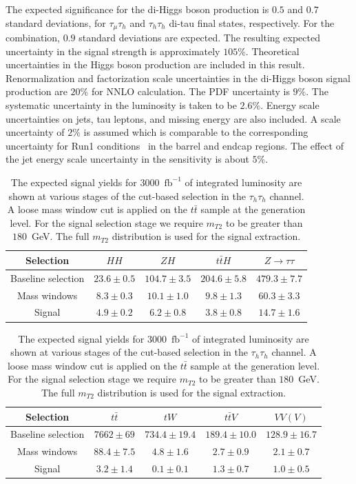 The expected significance for the di-Higgs boson production is $0.5$ and $0.7$ standard deviations, for
$\tau_{\mu}\tau_{h}$ and $\tau_{h}\tau_{h}$ di-tau final states,
respectively. For the combination, $0.9$ standard deviations are expected. The resulting expected
uncertainty in the signal strength is approximately
$105\%$. Theoretical uncertainties in the Higgs boson production are
included in this result. Renormalization and factorization scale
uncertainties in the di-Higgs boson signal production are $20\%$ for NNLO
calculation. The PDF uncertainty is $9\%$. The systematic uncertainty in
the luminosity is taken to be $2.6\%$. Energy scale uncertainties on jets, tau
leptons, and missing energy are also included. A scale uncertainty of $2\%$ is assumed which is comparable to the corresponding uncertainty for Run1 conditions~\cite{CMS-DP-2013-011} in the barrel and endcap regions. The effect of the jet energy scale uncertainty in the sensitivity is about $5\%$.       

\begin{table}[!ht]
\begin{center} 
\begin{tabular}{|c|c|c|c|c|}
\hline
Selection  & $HH$ & $ZH$ & $t\bar{t}H$ & $Z\rightarrow \tau\tau$  \\  \hline
Baseline selection & $23.6\pm0.5$ & $104.7\pm3.5$ & $204.6\pm5.8$ & $479.3\pm7.7$  \\
Mass windows  & $8.3\pm0.3$ & $10.1\pm1.0$ & $9.8\pm1.3$ & $60.3\pm3.3$ \\ 
Signal  & $4.9\pm0.2$ & $6.2\pm0.8$ &  $3.8\pm0.8$ & $14.7\pm1.6$ \\ \hline
\end{tabular}

\vspace{2mm}

\begin{tabular}{|c|c|c|c|c|}
\hline
Selection   & $t\bar{t}$ & $tW$ & $t\bar{t}V$ & $VV(V)$  \\  \hline
Baseline selection & $7662\pm69$ & $734.4\pm19.4$ & $189.4\pm10.0$ & $128.9\pm16.7$  \\
Mass windows  & $88.4\pm7.5$ & $4.8\pm1.6$ & $2.7\pm0.9$ & $2.1\pm0.7$ \\ 
Signal  & $3.2\pm1.4$ & $0.1\pm0.1$ & $1.3\pm0.7$ & $1.0\pm0.5$ \\ \hline
\end{tabular}

\caption{ The expected signal yields for $3000$~$\mathrm{fb}^{-1}$ of integrated luminosity are shown at various stages of the cut-based selection in the $\tau_{h}\tau_{h}$ channel. A loose mass window cut is applied on the $t\bar{t}$ sample at the  generation level. For the signal selection stage we require $m_{T2}$ to be greater than $180$~GeV. The full $m_{T2}$ distribution is used for the signal extraction.}
\label{tab:hhsig}
\end{center}
\end{table}


